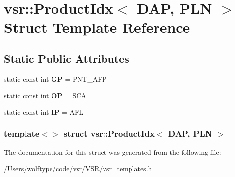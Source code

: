 \hypertarget{structvsr_1_1_product_idx_3_01_d_a_p_00_01_p_l_n_01_4}{\section{vsr\-:\-:Product\-Idx$<$ D\-A\-P, P\-L\-N $>$ Struct Template Reference}
\label{structvsr_1_1_product_idx_3_01_d_a_p_00_01_p_l_n_01_4}
}
\subsection*{Static Public Attributes}
\begin{DoxyCompactItemize}
\item 
\hypertarget{structvsr_1_1_product_idx_3_01_d_a_p_00_01_p_l_n_01_4_a323585720ac5105819e81a1a71112178}{static const int {\bfseries G\-P} = P\-N\-T\-\_\-\-A\-F\-P}\label{structvsr_1_1_product_idx_3_01_d_a_p_00_01_p_l_n_01_4_a323585720ac5105819e81a1a71112178}

\item 
\hypertarget{structvsr_1_1_product_idx_3_01_d_a_p_00_01_p_l_n_01_4_a8165c08bf6c6b37782a074a49b1f29a9}{static const int {\bfseries O\-P} = S\-C\-A}\label{structvsr_1_1_product_idx_3_01_d_a_p_00_01_p_l_n_01_4_a8165c08bf6c6b37782a074a49b1f29a9}

\item 
\hypertarget{structvsr_1_1_product_idx_3_01_d_a_p_00_01_p_l_n_01_4_a89c68aa547d4c44fb8a92355040de964}{static const int {\bfseries I\-P} = A\-F\-L}\label{structvsr_1_1_product_idx_3_01_d_a_p_00_01_p_l_n_01_4_a89c68aa547d4c44fb8a92355040de964}

\end{DoxyCompactItemize}
\subsubsection*{template$<$$>$ struct vsr\-::\-Product\-Idx$<$ D\-A\-P, P\-L\-N $>$}



The documentation for this struct was generated from the following file\-:\begin{DoxyCompactItemize}
\item 
/\-Users/wolftype/code/vsr/\-V\-S\-R/vsr\-\_\-templates.\-h\end{DoxyCompactItemize}
